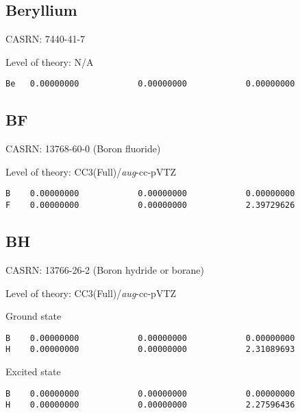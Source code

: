 \documentclass[journal=jctcce,manuscript=article,layout=traditional]{achemso}
\newcommand{\AVTZ}{\emph{aug}-cc-pVTZ}
\begin{document}
\subsection{Beryllium}

CASRN: 7440-41-7

\begin{singlespace}
\noindent  Level of theory: N/A
\begin{verbatim}
Be   0.00000000            0.00000000            0.00000000
\end{verbatim}
\end{singlespace}

\subsection{BF}

CASRN: 13768-60-0 (Boron fluoride)

\begin{singlespace}
\noindent  Level of theory: CC3(Full)/{\AVTZ}
\begin{verbatim}
B    0.00000000            0.00000000            0.00000000
F    0.00000000            0.00000000            2.39729626
\end{verbatim}
\end{singlespace}

\subsection{BH}

CASRN: 13766-26-2 (Boron hydride or borane)

\begin{singlespace}
\noindent  Level of theory: CC3(Full)/{\AVTZ}
\end{singlespace}

\begin{singlespace}
\noindent Ground state
\begin{verbatim}
B    0.00000000            0.00000000            0.00000000
H    0.00000000            0.00000000            2.31089693
\end{verbatim}
\end{singlespace}

\begin{singlespace}
\noindent Excited state
\begin{verbatim}
B    0.00000000            0.00000000            0.00000000
H    0.00000000            0.00000000            2.27596436
\end{verbatim}
\end{singlespace}
\end{document}
